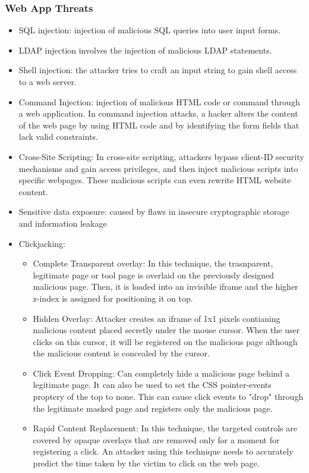 \subsubsection{Web App Threats}
\begin{itemize}
    \item SQL injection: injection of malicious SQL queries into user input forms.
    \item LDAP injection involves the injection of malicious LDAP statements.
    \item Shell injection: the attacker tries to craft an input string to gain shell access to a web server.
    \item Command Injection: injection of malicious HTML code or command through a web application. In command injection attacks, a hacker alters the content of the web page by using HTML code and by identifying the form fields that lack valid constraints.
    \item Cross-Site Scripting: In cross-site scripting, attackers bypass client-ID security mechanisms and gain access privileges, and then inject malicious scripts into specific webpages. These malicious scripts can even rewrite HTML website content.
    \item Sensitive data exposure: caused by flaws in insecure cryptographic storage and information leakage
    \item Clickjacking:
    \begin{itemize}
        \item Complete Transparent overlay: In this technique, the trasnparent, legitimate page or tool page is overlaid on the previously designed malicious page. Then, it is loaded into an invisible iframe and the higher z-index is assigned for positioning it on top.
        \item Hidden Overlay: Attacker creates an iframe of 1x1 pixels contianing malicious content placed secretly under the mouse cursor. When the user clicks on this cursor, it will be registered on the malicious page although the malicious content is concealed by the cursor.
        \item Click Event Dropping: Can completely hide a malicious page behind a legitimate page. It can also be used to set the CSS pointer-events proptery of the top to none. This can cause click events to "drop" through the legitimate masked page and registers only the malicious page.
        \item Rapid Content Replacement: In this technique, the targeted controls are covered by opaque overlays that are removed only for a moment for registering a click. An attacker using this technique needs to accurately predict the time taken by the victim to click on the web page.

\end{itemize}
\end{itemize}
